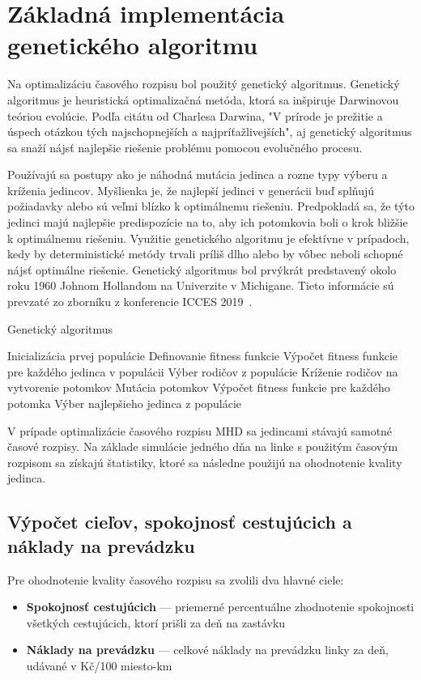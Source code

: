 \section{Základná implementácia genetického algoritmu}\label{implementacia_genetickeho_algoritmu}
Na optimalizáciu časového rozpisu bol použitý genetický algoritmus.
Genetický algoritmus je heuristická optimalizačná metóda, ktorá sa inšpiruje Darwinovou teóriou evolúcie.
Podľa citátu od Charlesa Darwina, "V prírode je prežitie a úspech otázkou tých najschopnejších a najpríťažlivejších",
aj genetický algoritmus sa snaží nájsť najlepšie riešenie problému pomocou evolučného procesu.

Používajú sa postupy ako je náhodná mutácia jedinca a rozne typy výberu a kríženia jedincov.
Myšlienka je, že najlepší jedinci v generácii buď splňujú požiadavky alebo sú veľmi blízko k optimálnemu riešeniu.
Predpokladá sa, že týto jedinci majú najlepšie predispozície na to, aby ich potomkovia boli o krok bližšie k optimálnemu riešeniu.
Využitie genetického algoritmu je efektívne v prípadoch, kedy by deterministické metódy trvali príliš dlho alebo by vôbec neboli schopné nájsť optimálne riešenie.
Genetický algoritmus bol prvýkrát predstavený okolo roku 1960 Johnom Hollandom na Univerzite v Michigane.
Tieto informácie sú prevzaté zo zborníku z konferencie ICCES 2019~\cite{immanuel2019genetic}.

\vspace*{\dimexpr0.5\baselineskip\relax}
\begin{algorithm}[H]\label{algoritmus_geneticky_algoritmus}
\caption{Genetický algoritmus}
  Inicializácia prvej populácie\;
  Definovanie fitness funkcie\;
  Výpočet fitness funkcie pre každého jedinca v populácii\;
   {
    Výber rodičov z populácie\;
    Kríženie rodičov na vytvorenie potomkov\;
    Mutácia potomkov\;
    Výpočet fitness funkcie pre každého potomka\;
  }
  Výber najlepšieho jedinca z populácie\;
\end{algorithm}

V prípade optimalizácie časového rozpisu MHD sa jedincami stávajú samotné časové rozpisy.
Na základe simulácie jedného dňa na linke s použitým časovým rozpisom sa získajú štatistiky, ktoré sa následne použijú na ohodnotenie kvality jedinca.

\subsection*{Výpočet cieľov, spokojnosť cestujúcich a náklady na prevádzku}
Pre ohodnotenie kvality časového rozpisu sa zvolili dva hlavné ciele:
\begin{itemize}
  \item \textbf{Spokojnosť cestujúcich} --- priemerné percentuálne zhodnotenie spokojnosti všetkých cestujúcich, ktorí prišli za deň na zastávku
  \item \textbf{Náklady na prevádzku} --- celkové náklady na prevádzku linky za deň, udávané v Kč/100 miesto-km
\end{itemize}

